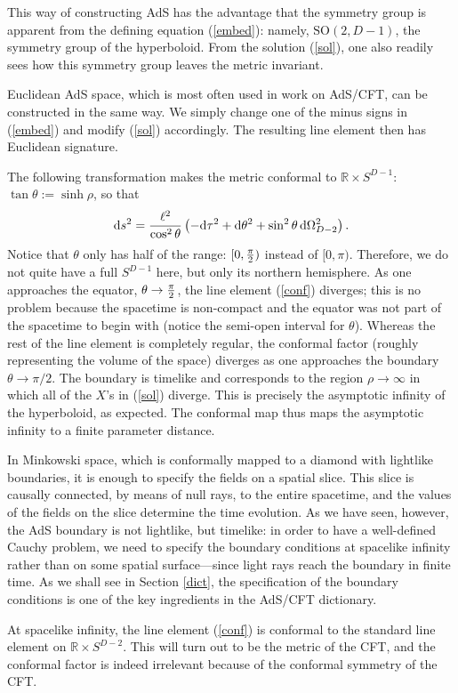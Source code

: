 \documentclass[12pt]{article}
\def\r{\rho}
\def\t{\tau}
\def\th{\theta}
\def\dd{\mbox{d}}
\def\O{\Omega}
\def\r{\rho}
\def\t{\tau}
\def\th{\theta}
\renewcommand{\^}[1]{\hat{#1}}
\newcommand{\bea}{\begin{eqnarray}}
\newcommand{\eea}{\end{eqnarray}}
\newcommand{\eq}[1]{(\ref{#1})}
\begin{document}
This way of constructing AdS has the advantage that the symmetry group is apparent from the defining equation \eq{embed}: namely, $\mbox{SO}(2,D-1)$, the symmetry group of the hyperboloid. From the solution \eq{sol}, one also readily sees how this symmetry group leaves the metric invariant.


Euclidean AdS space, which is most often used in work on  AdS/CFT, can be constructed in the same way. We simply change one of the minus signs in \eq{embed} and modify \eq{sol} accordingly. The resulting line element then has Euclidean signature. 

The following transformation makes the metric conformal to $\mathbb{R}\times S^{D-1}$: $\tan\th:=\sinh\r$, so that
\bea\label{conf}
\dd s^2={\ell^2\over\cos^2\th}\left(-\dd\t^2+\dd\th^2+\sin^2\th\,\dd\O_{D-2}^2\right).
\eea
Notice that $\th$ only has half of the range: $[0,{\pi\over2})$ instead of $[0,\pi)$. Therefore, we do not quite have a full $S^{D-1}$ here, but only its northern hemisphere. As one approaches the equator, $\th\rightarrow{\pi\over2}$, the line element \eq{conf} diverges; this is no problem because the spacetime is non-compact and the equator was not part of the spacetime to begin with (notice the semi-open interval for $\th$). Whereas the rest of the line element is completely regular, the conformal factor (roughly representing the volume of the space) diverges as one approaches the boundary  $\th\rightarrow\pi/2$. The boundary is timelike and corresponds to the region $\r\rightarrow\infty$ in which all of the $X$'s in \eq{sol} diverge. This is precisely the asymptotic infinity of the hyperboloid, as expected. The conformal map thus maps the asymptotic infinity to a finite parameter distance. 

In Minkowski space, which is conformally mapped to a diamond with lightlike boundaries, it is enough to specify the fields on a spatial slice. This slice is causally connected, by means of null rays, to the entire spacetime, and the values of the fields on the slice determine the time evolution. As we have seen, however, the AdS boundary is not lightlike, but timelike: in order to have a well-defined Cauchy problem, we need to specify the boundary conditions at spacelike infinity rather than on some spatial surface---since light rays reach the boundary in finite time. As we shall see in Section \ref{dict}, the specification of the boundary conditions is one of the key ingredients in the AdS/CFT dictionary.

At spacelike infinity, the line element \eq{conf} is conformal to the standard line element on $\mathbb{R}\times S^{D-2}$. This will turn out to be the metric of the CFT, and the conformal factor is indeed irrelevant because of the conformal symmetry of the CFT. 
\end{document}
